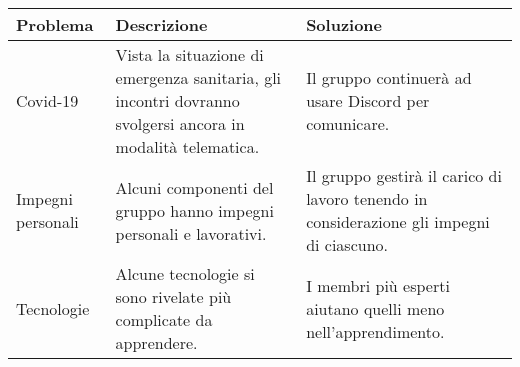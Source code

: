 \setcounter{table}{-1}
{


\centering
\renewcommand{\arraystretch}{1.5}
\begin{longtable}{C{2cm} C{6.6cm} C{6cm}}
\textbf{Problema} &
\textbf{Descrizione}&
\textbf{Soluzione}\\
\endhead

Covid-19 & Vista la situazione di emergenza sanitaria, gli incontri dovranno svolgersi ancora in modalità telematica. & Il gruppo continuerà ad usare Discord per comunicare. \\
Impegni personali & Alcuni componenti del gruppo hanno impegni personali e lavorativi. & Il gruppo gestirà il carico di lavoro tenendo in considerazione gli impegni di ciascuno. \\
Tecnologie & Alcune tecnologie si sono rivelate più complicate da apprendere. & I membri più esperti aiutano quelli meno nell'apprendimento. \\

		
\end{longtable}
}